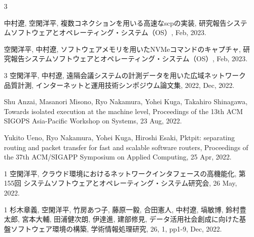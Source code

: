 \begin{発表}{3}

中村遼, 空閑洋平, 複数コネクションを用いる高速なscpの実装, 研究報告システムソフトウェアとオペレーティング・システム（OS）, Feb, 2023.

空閑洋平, 中村遼, ソフトウェアメモリを用いたNVMeコマンドのキャプチャ, 研究報告システムソフトウェアとオペレーティング・システム（OS）, Feb, 2023.

\end{発表}

\begin{査読付}{3}
空閑洋平, 中村遼, 遠隔会議システムの計測データを用いた広域ネットワーク品質計測, インターネットと運用技術シンポジウム論文集, 2022, Dec, 2022.

Shu Anzai, Masanori Misono, Ryo Nakamura, Yohei Kuga, Takahiro Shinagawa, Towards isolated execution at the machine level, Proceedings of the 13th ACM SIGOPS Asia-Pacific Workshop on Systems, 23 Aug, 2022.

Yukito Ueno, Ryo Nakamura, Yohei Kuga, Hiroshi Esaki, Pktpit: separating routing and packet transfer for fast and scalable software routers, Proceedings of the 37th ACM/SIGAPP Symposium on Applied Computing, 25 Apr, 2022.

\end{査読付}

\begin{招待講演}{1}
空閑洋平, クラウド環境におけるネットワークインタフェースの高機能化, 第155回 システムソフトウェアとオペレーティング・システム研究会, 26 May, 2022.

\end{招待講演}

\begin{招待論文}{1}
杉木章義, 空閑洋平, 竹房あつ子, 藤原一毅, 合田憲人, 中村遼, 塙敏博, 鈴村豊太郎, 宮本大輔, 田浦健次朗, 伊達進, 建部修見, データ活用社会創成に向けた基盤ソフトウェア環境の構築, 学術情報処理研究, 26, 1, pp1-9, Dec, 2022.

\end{招待論文}